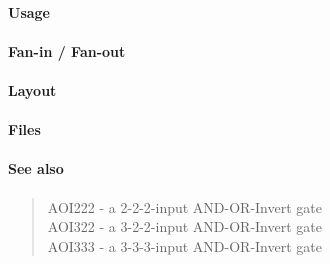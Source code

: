 \paragraph{Usage}

\paragraph{Fan-in / Fan-out}

\paragraph{Layout}

\paragraph{Files}

\paragraph{See also}
\begin{quote}
    AOI222 - a 2-2-2-input AND-OR-Invert gate \\
    AOI322 - a 3-2-2-input AND-OR-Invert gate \\
    AOI333 - a 3-3-3-input AND-OR-Invert gate
\end{quote}
